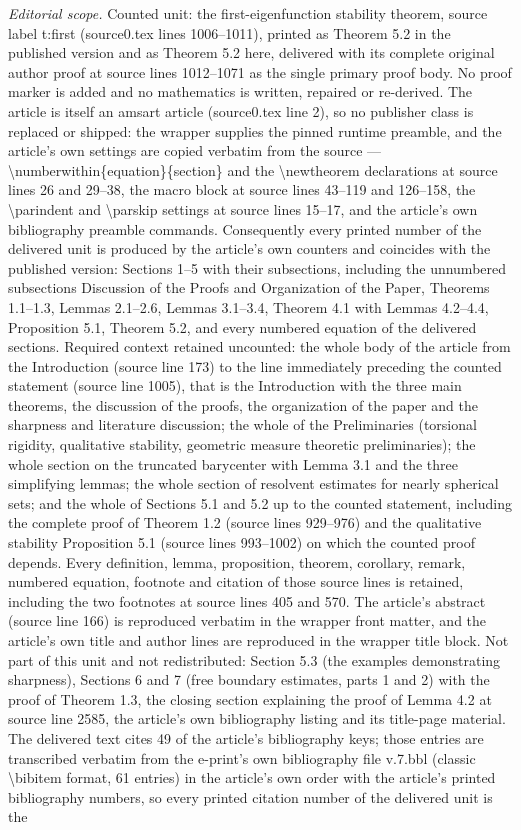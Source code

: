 \documentclass[10pt,a4paper]{amsart}
\numberwithin{equation}{section}
\begin{document}
\noindent\textit{Editorial scope.} Counted unit: the first-eigenfunction stability theorem, source label t:first (source0.tex lines 1006--1011), printed as Theorem 5.2 in the published version and as Theorem 5.2 here, delivered with its complete original author proof at source lines 1012--1071 as the single primary proof body. No proof marker is added and no mathematics is written, repaired or re-derived. The article is itself an amsart article (source0.tex line 2), so no publisher class is replaced or shipped: the wrapper supplies the pinned runtime preamble, and the article's own settings are copied verbatim from the source --- \textbackslash{}numberwithin\{equation\}\{section\} and the \textbackslash{}newtheorem declarations at source lines 26 and 29--38, the macro block at source lines 43--119 and 126--158, the \textbackslash{}parindent and \textbackslash{}parskip settings at source lines 15--17, and the article's own bibliography preamble commands. Consequently every printed number of the delivered unit is produced by the article's own counters and coincides with the published version: Sections 1--5 with their subsections, including the unnumbered subsections Discussion of the Proofs and Organization of the Paper, Theorems 1.1--1.3, Lemmas 2.1--2.6, Lemmas 3.1--3.4, Theorem 4.1 with Lemmas 4.2--4.4, Proposition 5.1, Theorem 5.2, and every numbered equation of the delivered sections. Required context retained uncounted: the whole body of the article from the Introduction (source line 173) to the line immediately preceding the counted statement (source line 1005), that is the Introduction with the three main theorems, the discussion of the proofs, the organization of the paper and the sharpness and literature discussion; the whole of the Preliminaries (torsional rigidity, qualitative stability, geometric measure theoretic preliminaries); the whole section on the truncated barycenter with Lemma 3.1 and the three simplifying lemmas; the whole section of resolvent estimates for nearly spherical sets; and the whole of Sections 5.1 and 5.2 up to the counted statement, including the complete proof of Theorem 1.2 (source lines 929--976) and the qualitative stability Proposition 5.1 (source lines 993--1002) on which the counted proof depends. Every definition, lemma, proposition, theorem, corollary, remark, numbered equation, footnote and citation of those source lines is retained, including the two footnotes at source lines 405 and 570. The article's abstract (source line 166) is reproduced verbatim in the wrapper front matter, and the article's own title and author lines are reproduced in the wrapper title block. Not part of this unit and not redistributed: Section 5.3 (the examples demonstrating sharpness), Sections 6 and 7 (free boundary estimates, parts 1 and 2) with the proof of Theorem 1.3, the closing section explaining the proof of Lemma 4.2 at source line 2585, the article's own bibliography listing and its title-page material. The delivered text cites 49 of the article's bibliography keys; those entries are transcribed verbatim from the e-print's own bibliography file v.7.bbl (classic \textbackslash{}bibitem format, 61 entries) in the article's own order with the article's printed bibliography numbers, so every printed citation number of the delivered unit is the 
\end{document}
